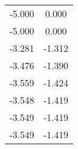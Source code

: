 
\begin{table}[h]
\centering
\begin{tabular}{cc}
-5.000	&	0.000	 \\ 
-5.000	&	0.000	 \\ 
-3.281	&	-1.312	 \\ 
-3.476	&	-1.390	 \\ 
-3.559	&	-1.424	 \\ 
-3.548	&	-1.419	 \\ 
-3.549	&	-1.419	 \\ 
-3.549	&	-1.419	 \\ 
\end{tabular}
\end{table}
